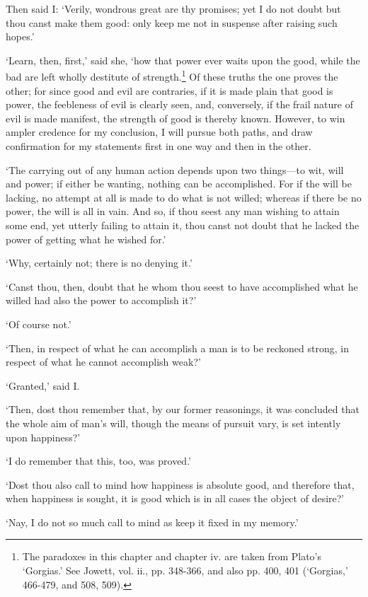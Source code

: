 \documentclass[12pt]{book}
\begin{document}
Then said I: `Verily, wondrous great are thy promises; yet I do not
doubt but thou canst make them good: only keep me not in suspense after
raising such hopes.'

`Learn, then, first,' said she, `how that power ever waits upon the  
good, while the bad are left wholly destitute of strength.\footnote{The 
paradoxes in this chapter and chapter iv. are taken from Plato's        
`Gorgias.' See Jowett, vol. ii., pp. 348-366, and also pp. 400, 401     
(`Gorgias,' 466-479, and 508, 509).} Of these truths the one proves the 
other; for since good and evil are contraries, if it is made plain that 
good is power, the feebleness of evil is clearly seen, and, conversely, 
if the frail nature of evil is made manifest, the strength of good is   
thereby known. However, to win ampler credence for my conclusion, I     
will pursue both paths, and draw confirmation for my statements first   
in one way and then in the other.                                       

`The carrying out of any human action depends upon two things---to wit,
will and power; if either be wanting, nothing can be accomplished. For
if the will be lacking, no attempt at all is made to do what is not
willed; whereas if there be no power, the will is all in vain. And so,
if thou seest any man wishing to attain some end, yet utterly failing to
attain it, thou canst not doubt that he lacked the power of getting what
he wished for.'

`Why, certainly not; there is no denying it.'

`Canst thou, then, doubt that he whom thou seest to have accomplished
what he willed had also the power to accomplish it?'

`Of course not.'

`Then, in respect of what he can accomplish a man is to be reckoned
strong, in respect of what he cannot accomplish weak?'

`Granted,' said I.

`Then, dost thou remember that, by our former reasonings, it was
concluded that the whole aim of man's will, though the means of pursuit
vary, is set intently upon happiness?'

`I do remember that this, too, was proved.'

`Dost thou also call to mind how happiness is absolute good, and
therefore that, when happiness is sought, it is good which is in all
cases the object of desire?'

`Nay, I do not so much call to mind as keep it fixed in my memory.'
\end{document}
